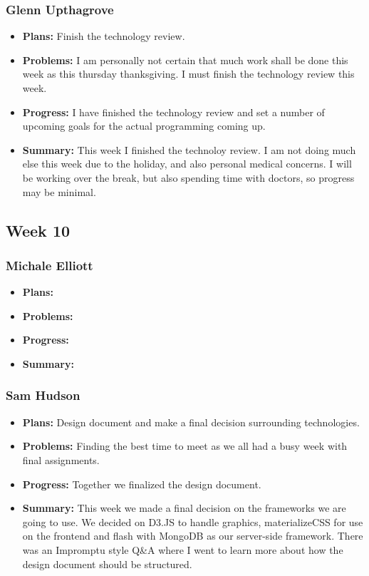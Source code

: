 \documentclass[onecolumn, draftclsnofoot,10pt, compsoc]{IEEEtran}
\begin{document}
\subsubsection{Glenn Upthagrove}
\begin {itemize}
 \item \textbf{Plans: }Finish the technology review. 
 \item \textbf{Problems: }I am personally not certain that much work shall be done this week as this thursday thanksgiving. I must finish the technology review this week.
 \item \textbf{Progress: }I have finished the technology review and set a number of upcoming goals for the actual programming coming up. 
 \item \textbf{Summary: }This week I finished the technoloy review. I am not doing much else this week due to the holiday, and also personal medical concerns. I will be working over the break, but also spending time with doctors, so progress may be minimal. 
\end {itemize}
\subsection {Week 10}
\subsubsection{Michale Elliott}
\begin {itemize}
 \item \textbf{Plans: }
 \item \textbf{Problems: }
 \item \textbf{Progress: }
 \item \textbf{Summary: }
\end {itemize}
\subsubsection{Sam Hudson}
\begin {itemize}
\item \textbf{Plans: }Design document and make a final decision surrounding technologies.
\item \textbf{Problems: }Finding the best time to meet as we all had a busy week with final assignments.
\item \textbf{Progress: }Together we finalized the design document.
\item \textbf{Summary: }This week we made a final decision on the frameworks we are going to use. We decided on D3.JS to handle graphics, materializeCSS for use on the frontend and flash with MongoDB as our server-side framework. There was an Impromptu style Q&A where I went to learn more about how the design document should be structured. 
\end {itemize}
\end{document}
